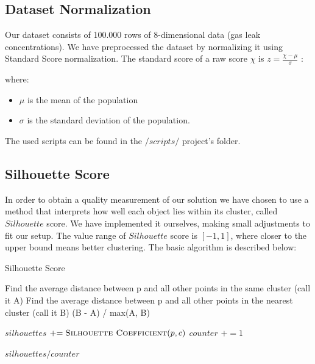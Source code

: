 \documentclass{lmproj}
\newcommand{\pluseq}{\mathrel{+}=}
\begin{document}
\subsection{Dataset Normalization}
Our dataset consists of 100.000 rows of 8-dimensional data (gas leak concentrations). We have preprocessed the dataset by normalizing it using Standard Score normalization. The standard score of a raw score $\chi$ is $z=\frac{\chi - \mu}{\sigma}$ :

where:
\begin{itemize}
	\item $\mu$ is the mean of the population
	\item $\sigma$ is the standard deviation of the population.
\end{itemize}

The used scripts can be found in the $/scripts/$ project's folder.

\subsection{Silhouette Score}

In order to obtain a quality measurement of our solution we have chosen to use a method that interprets how well each object lies within its cluster, called $Silhouette$ score. We have implemented it ourselves, making small adjustments to fit our setup. The value range of $Silhouette$ score is $[-1,1]$, where closer to the upper bound means better clustering. The basic algorithm is described below:

\bigskip


\begin{algorithm}[H]
	\caption{Silhouette Score}
	\begin{algorithmic}[1]
		\label{silhouette_coefficient}
		
			\State Find the average distance between p and all other points in the same cluster (call it A)
			\State Find the average distance between p and all other points in the nearest cluster (call it B)
			\Return (B - A) / max(A, B)
		
		\EndFunction
	\end{algorithmic}
	\bigskip
	\begin{algorithmic}[1]
		\label{silhouette_score}
		
			\State $silhouettes$ $\pluseq \Call {Silhouette Coefficient}{p,c}$
			\State $counter$ $\pluseq 1$
		\EndFor
		
		\Return $silhouettes/counter$
		\EndFunction
	\end{algorithmic}
\end{algorithm}
\end{document}
